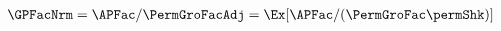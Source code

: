   \begin{align}
    \GPFacNrm  & = \APFac/\PermGroFacAdj = \Ex[\APFac/(\PermGroFac\permShk)]  \label{eq:GPFacModDefn}
  \end{align}

